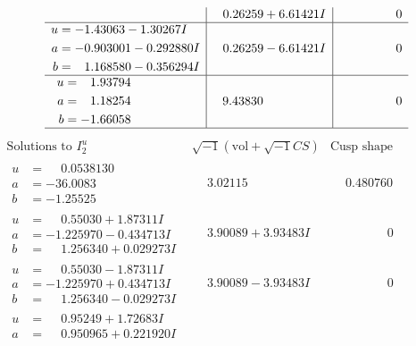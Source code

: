 \documentclass[1p]{elsarticle_modified}
\theoremstyle{definition}
\newcommand{\I}{\sqrt{-1}}
\begin{document}
$$\begin{array}{c|c|c}
 & \phantom{-}0.26259 + 6.61421 I & \phantom{-0.000000 } 0 \\ \hline\begin{aligned}
u &= -1.43063 - 1.30267 I \\
a &= -0.903001 - 0.292880 I \\
b &= \phantom{-}1.168580 - 0.356294 I\end{aligned}
 & \phantom{-}0.26259 - 6.61421 I & \phantom{-0.000000 } 0 \\ \hline\begin{aligned}
u &= \phantom{-}1.93794\phantom{ +0.000000I} \\
a &= \phantom{-}1.18254\phantom{ +0.000000I} \\
b &= -1.66058\phantom{ +0.000000I}\end{aligned}
 & \phantom{-}9.43830\phantom{ +0.000000I} & \phantom{-0.000000 } 0\\
 \hline 
 \end{array}$$\newpage$$\begin{array}{c|c|c}  
\text{Solutions to }I^u_{2}& \I (\text{vol} + \sqrt{-1}CS) & \text{Cusp shape}\\
 \hline 
\begin{aligned}
u &= \phantom{-}0.0538130\phantom{ +0.000000I} \\
a &= -36.0083\phantom{ +0.000000I} \\
b &= -1.25525\phantom{ +0.000000I}\end{aligned}
 & \phantom{-}3.02115\phantom{ +0.000000I} & \phantom{-}0.480760\phantom{ +0.000000I} \\ \hline\begin{aligned}
u &= \phantom{-}0.55030 + 1.87311 I \\
a &= -1.225970 - 0.434713 I \\
b &= \phantom{-}1.256340 + 0.029273 I\end{aligned}
 & \phantom{-}3.90089 + 3.93483 I & \phantom{-0.000000 } 0 \\ \hline\begin{aligned}
u &= \phantom{-}0.55030 - 1.87311 I \\
a &= -1.225970 + 0.434713 I \\
b &= \phantom{-}1.256340 - 0.029273 I\end{aligned}
 & \phantom{-}3.90089 - 3.93483 I & \phantom{-0.000000 } 0 \\ \hline\begin{aligned}
u &= \phantom{-}0.95249 + 1.72683 I \\
a &= \phantom{-}0.950965 + 0.221920 I \\

\end{aligned}
\end{array}$$
\end{document}
